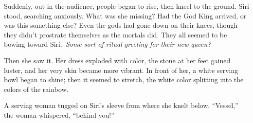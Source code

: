 Suddenly, out in the audience, people began to rise, then kneel to the ground. Siri stood, searching anxiously. What was she missing? Had the God King arrived, or was this something else? Even the gods had gone down on their knees, though they didn’t prostrate themselves as the mortals did. They all seemed to be bowing toward Siri.~\textit{Some sort of ritual greeting for their new queen?}

Then she saw it. Her dress exploded with color, the stone at her feet gained luster, and her very skin became more vibrant. In front of her, a white serving bowl began to shine; then it seemed to stretch, the white color splitting into the colors of the rainbow.

A serving woman tugged on Siri’s sleeve from where she knelt below. “Vessel,” the woman whispered, “behind you!”

